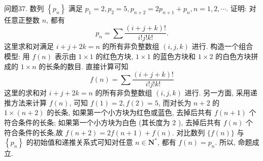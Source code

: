 问题37. 数列 $\left\{p_n\right\}$ 满足 $p_1=2, p_2=5, p_{n+2}=2 p_{n+1}+p_n, n=1,2, \cdots$. 证明: 对任意正整数 $n$, 都有
$$
p_n=\sum \frac{(i+j+k) !}{i ! j ! k !} .
$$
这里求和对满足 $i+j+2 k=n$ 的所有非负整数组 $(i, j, k)$ 进行.
构造一个组合模型: 用 $f(n)$ 表示由 $1 \times 1$ 的红色方块, $1 \times 1$ 的蓝色方块和 $1 \times 2$ 的白色方块拼成的 $1 \times n$ 的长条的数目.
直接计算可知
$$
f(n)=\sum \frac{(i+j+k) !}{i ! j ! k !}
$$
这里的求和对 $i+j+2 k=n$ 的所有非负整数组 $(i, j, k)$ 进行.
另一方面, 采用递推方法来计算 $f(n)$, 可知 $f(1)=2, f(2)=5$, 而对长为 $n+2$ 的 $1 \times(n+2)$ 的长条, 如果第一个小方块为红色或蓝色, 去掉后共有 $f(n+1)$ 个符合条件的长条; 如果第一个小方块为白色 (其长度为 2 ), 去掉后共有 $f(n)$ 个符合条件的长条,故 $f(n+2)=2 f(n+1)+f(n)$.
对比数列 $\{f(n)\}$ 与 $\left\{p_n\right\}$ 的初始值和递推关系式可知对任意 $n \in \mathbf{N}^*$, 都有 $f(n)=p_n$.
所以, 命题成立.



